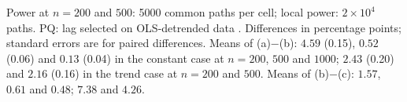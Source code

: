 Power at $n = 200$
and $500$: 5000 common paths per cell; local power: $2\times10^4$ paths.
PQ: lag selected on OLS-detrended data \citep{perron2007simple}.
Differences in percentage points; standard errors are for paired
differences. Means of (a)$-$(b): $4.59$ (0.15), $0.52$ (0.06) and $0.13$ (0.04) in the constant case at $n = 200$, $500$ and $1000$; $2.43$ (0.20) and $2.16$ (0.16) in the trend case at $n = 200$ and $500$. Means of
(b)$-$(c): $1.57$, $0.61$ and $0.48$; $7.38$ and $4.26$.
